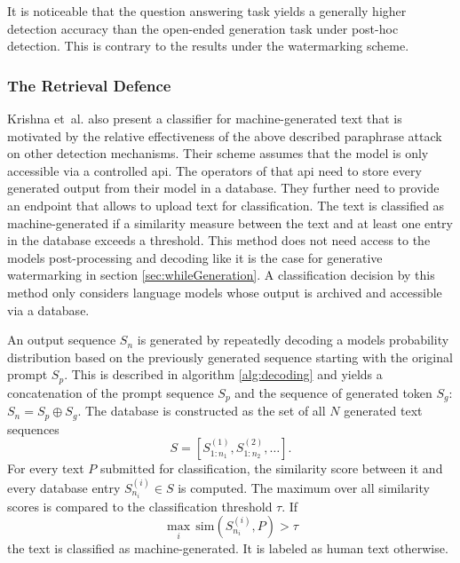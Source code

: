     It is noticeable that the question answering task yields a generally higher detection accuracy than the open-ended generation task under post-hoc detection.
    This is contrary to the results under the watermarking scheme.
    
    \subsubsection{The Retrieval Defence}
    Krishna et~al. \cite{krishna2023paraphrasing} also present a classifier for machine-generated text that is motivated by the relative effectiveness of the above described paraphrase attack on other detection mechanisms.
    Their scheme assumes that the model is only accessible via a controlled \ac{api}.
    The operators of that \ac{api} need to store every generated output from their model in a database.
    They further need to provide an endpoint that allows to upload text for classification.
    The text is classified as machine-generated if a similarity measure between the text and at least one entry in the database exceeds a threshold.
    This method does not need access to the models post-processing and decoding like it is the case for generative watermarking in section \ref{sec:whileGeneration}.
    A classification decision by this method only considers language models whose output is archived and accessible via a database.

    An output sequence $S_n$ is generated by repeatedly decoding a models probability distribution based on the previously generated sequence starting with the original prompt $S_p$.
    This is described in algorithm \ref{alg:decoding} and yields a concatenation of the prompt sequence $S_p$ and the sequence of generated token $S_g$: $S_n = S_p \oplus S_g$.
    The database is constructed as the set of all $N$ generated text sequences
    \begin{equation}
        S = \left[ S_{1:n_1}^{(1)}, S_{1:n_2}^{(2)}, \dots \right] \text{.} 
    \end{equation}
    For every text $P$ submitted for classification, the similarity score between it and every database entry $S_{n_i}^{(i)} \in S$ is computed.
    The maximum over all similarity scores is compared to the classification threshold $\tau$.
    If 
    \begin{equation}
        \max_{i} \, \mathrm{sim} \left( S_{n_i}^{(i)}, P \right) > \tau
    \end{equation}
    the text is classified as machine-generated.
    It is labeled as human text otherwise.

